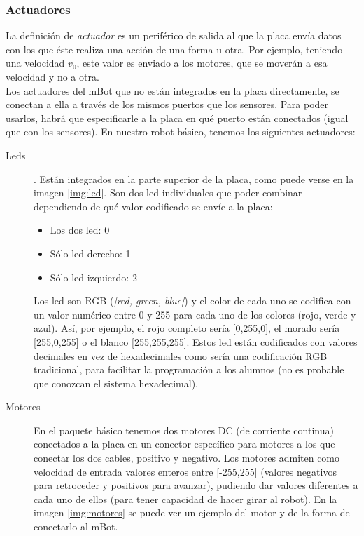 \subsubsection{Actuadores}\label{subsec:actuadores}
	La definición de \textit{actuador} es un periférico de salida al que la placa envía datos con los que éste realiza una acción de una forma u otra. Por ejemplo, teniendo una velocidad $v_0$, este valor es enviado a los motores, que se moverán a esa velocidad y no a otra. \\
	Los actuadores del mBot que no están integrados en la placa directamente, se conectan a ella a través de los mismos puertos que los sensores. Para poder usarlos, habrá que especificarle a la placa en qué puerto están conectados (igual que con los sensores). En nuestro robot básico, tenemos los siguientes actuadores:
	\begin{description}
	\item [Leds]. Están integrados en la parte superior de la placa, como puede verse en la imagen \ref{img:led}. Son dos led individuales que poder combinar dependiendo de qué valor codificado se envíe a la placa:
	\begin{itemize}
		\item Los dos led: 0
		\item Sólo led derecho: 1
		\item Sólo led izquierdo: 2
	\end{itemize}
	Los led son RGB (\textit{[red, green, blue]}) y el color de cada uno se codifica con un valor numérico entre 0 y 255 para cada uno de los colores (rojo, verde y azul). Así, por ejemplo, el rojo completo sería [0,255,0], el morado sería [255,0,255] o el blanco [255,255,255]. Estos led están codificados con valores decimales en vez de hexadecimales como sería una codificación RGB tradicional, para facilitar la programación a los alumnos (no es probable que conozcan el sistema hexadecimal).		
	
	\item [Motores] En el paquete básico tenemos dos motores DC (de corriente continua) conectados a la placa en un conector específico para motores a los que conectar los dos cables, positivo y negativo. Los motores admiten como velocidad de entrada valores enteros entre [-255,255] (valores negativos para retroceder y positivos para avanzar), pudiendo dar valores diferentes a cada uno de ellos (para tener capacidad de hacer girar al robot). En la imagen \ref{img:motores} se puede ver un ejemplo del motor y de la forma de conectarlo al mBot.	


\end{description}
